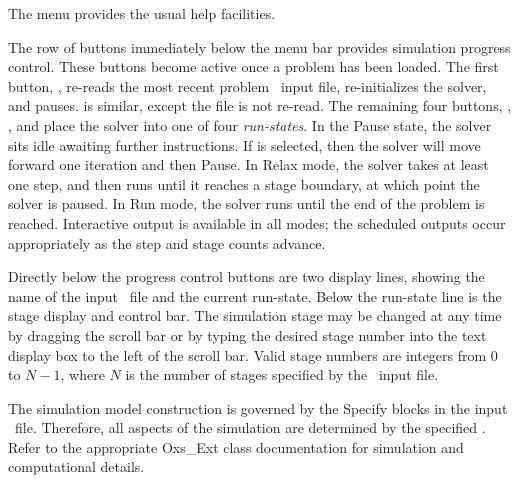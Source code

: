 The  menu provides the usual help facilities.

The row of buttons immediately below the menu bar provides simulation
progress control.  These buttons become active once a problem has
been loaded.  The first button, , re-reads the most recent
problem \MIF\ input file, re-initializes the solver, and pauses.
 is similar, except the file is not re-read.  The remaining
four buttons, ,
,  and  place the solver into one of
four \textit{run-states}.  In the Pause state, the solver sits idle
awaiting further instructions.  If  is selected, then the
solver will move forward one iteration and then Pause.  In Relax mode,
the solver takes at least one step, and then runs until it reaches a
stage boundary, at which point the solver is paused.  In Run mode, the
solver runs until the end of the problem is reached.  Interactive output
is available in all modes; the scheduled outputs occur appropriately as
the step and stage counts advance.

Directly below the progress control buttons are two display lines,
showing the name of the input \MIF\ file and the current run-state.
Below the run-state  line is the stage display and control
bar.  The simulation stage may be changed at any time by dragging the
scroll bar or by typing the desired stage number into the text display
box to the left of the scroll bar.  Valid stage numbers are integers
from 0 to $N-1$, where $N$ is the number of stages specified by the
\MIF\ input file.

The simulation model construction is governed by the Specify blocks in
the input \MIF\ file.  Therefore, all aspects of the simulation are
determined by the specified
.
Refer to the appropriate Oxs\_Ext class documentation for simulation and
computational details.


